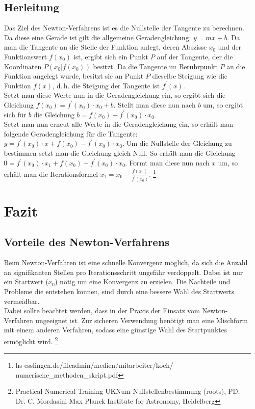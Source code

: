 \documentclass[a4paper,12pt,fleqn,oneside]{article}
\begin{document}
	\subsection{Herleitung}
		Das Ziel des Newton-Verfahrens ist es die Nullstelle der Tangente zu berechnen. Da diese eine Gerade ist gilt die allgemeine Geradengleichung:
		$y = mx + b$. Da man die Tangente an die Stelle der Funktion anlegt, deren Abszisse $x_0$ und der Funktionswert $f(x_0)$ ist, ergibt sich ein Punkt
		$P$ auf der Tangente, der die Koordinaten $P(x_0|f(x_0))$ besitzt. Da die Tangente im Berührpunkt $P$ an die Funktion angelegt wurde, besitzt
		sie an Punkt $P$ dieselbe Steigung wie die Funktion $f(x)$, d.\,h. die Steigung der Tangente ist $f^\prime(x)$.\\
		Setzt man diese Werte nun in die Geradengleichung ein, so ergibt sich die Gleichung $f(x_0) = f^\prime(x_0) \cdot x_0  + b$. Stellt man diese
		nun nach $b$ um, so ergibt sich für $b$ die Gleichung $b = f(x_0) - f^\prime(x_0) \cdot x_0$.\\
		Setzt man nun erneut alle Werte in die Geradengleichung ein, so erhält man folgende Geradengleichung für die Tangente:
		$y = f^\prime(x_0) \cdot x  + f(x_0) - f^\prime(x_0) \cdot x_0$. Um die Nullstelle der Gleichung zu bestimmen setzt man die Gleichung gleich
		Null. So erhält man die Gleichung $0 = f^\prime(x_0) \cdot x_1  + f(x_0) - f^\prime(x_0) \cdot x_0$. Formt man diese nun nach $x$ um, so
		erhält man die Iterationsformel $x_1 =x_0 - \frac{f(x_0)}{f^\prime(x_0)}$.
		\footnote{hs-esslingen.de/fileadmin/medien/mitarbeiter/koch/\\numerische\_methoden\_skript.pdf}
	
\newpage
		
\section{Fazit}
	\subsection{Vorteile des Newton-Verfahrens}
		Beim Newton-Verfahren ist eine schnelle Konvergenz möglich, da sich die Anzahl an signifikanten Stellen pro Iterationsschritt ungefähr verdoppelt.
		Dabei ist nur ein Startwert ($x_0$) nötig um eine Konvergenz zu erzielen. Die Nachteile und Probleme die entstehen können, sind durch eine
		bessere Wahl des Startwerts vermeidbar.\\
		Dabei sollte beachtet werden, dass in der Praxis der Einsatz vom Newton-Verfahren ungeeignet ist. Zur sicheren Verwendung benötigt man eine
		Mischform mit einem anderen Verfahren, sodass eine günstige Wahl des Startpunktes ermöglicht wird.
		\footnote{Practical Numerical Training UKNum Nullstellenbestimmung (roots), PD. Dr. C. Mordasini Max Planck Institute for Astronomy, Heidelberg}
	
\end{document}
